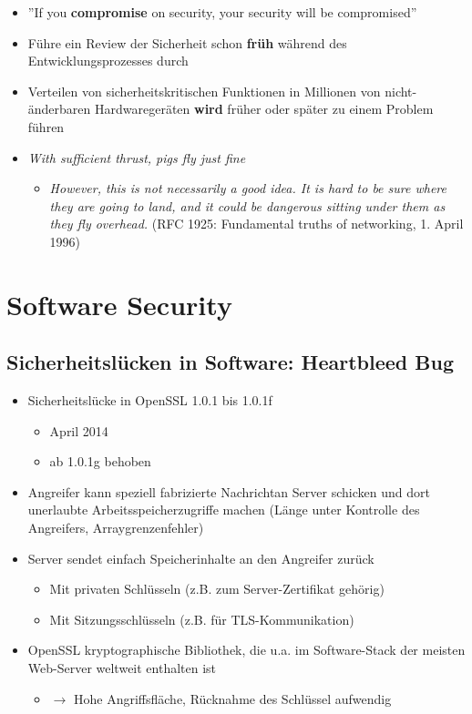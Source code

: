\documentclass[openany]{book}
\begin{document}
\begin{itemize}
    \item ''If you \textbf{compromise} on security, your security will be compromised''
    \item Führe ein Review der Sicherheit schon \textbf{früh} während des Entwicklungsprozesses durch
    \item Verteilen von sicherheitskritischen Funktionen in Millionen von nicht-änderbaren Hardwaregeräten \textbf{wird} früher oder später zu einem Problem führen
    \item \textit{With sufficient thrust, pigs fly just fine}
    \begin{itemize}
        \item \textit{However, this is not necessarily a good idea. It is hard to be sure where they are going to land, and it could be dangerous sitting under them as they fly overhead.} (RFC 1925: Fundamental truths of networking, 1. April 1996)
    \end{itemize}
\end{itemize}

\chapter{Software Security}

\section{Sicherheitslücken in Software: Heartbleed Bug}

\begin{itemize}
    \item Sicherheitslücke in OpenSSL 1.0.1 bis 1.0.1f
    \begin{itemize}
        \item April 2014
        \item ab 1.0.1g behoben
    \end{itemize}
    \item Angreifer kann speziell fabrizierte Nachrichtan Server schicken und dort unerlaubte Arbeitsspeicherzugriffe machen (Länge unter Kontrolle des Angreifers, Arraygrenzenfehler)
    \item Server sendet einfach Speicherinhalte an den Angreifer zurück
    \begin{itemize}
        \item Mit privaten Schlüsseln (z.B. zum Server-Zertifikat gehörig)
        \item Mit Sitzungsschlüsseln (z.B. für TLS-Kommunikation)
    \end{itemize}
    \item OpenSSL kryptographische Bibliothek, die u.a. im Software-Stack der meisten Web-Server weltweit enthalten ist
    \begin{itemize}
        \item $\rightarrow$ Hohe Angriffsfläche, Rücknahme des Schlüssel aufwendig
    \end{itemize}
\end{itemize}
\end{document}
